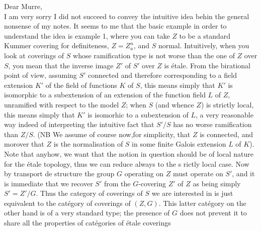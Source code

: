 
Dear Murre,\\

I am very sorry I did not succeed to convey the intuitive idea behin the general nonsense of my notes. It seems to me that the basic example in order to understand the idea is example 1, where you can take $Z$ to be a standard Kummer covering for definiteness, $Z=Z_a^n$, and $S$ normal. Intuitively, when you look at coverings  of $S$ whose ramification type is not worse than the one of $Z$ over $S$, you mean that the  inverse image $Z'$ of $S'$ over $Z$ is étale.  From the birational point of view, assuming $S'$ connected and therefore corresponding to a field extension $K'$ of the field of functions $K$ of $S$, this means simply that $K'$ is isomorphic to a subextension of an extension  of the function field $L$ of $Z$, unramified with respect to the model $Z$; when $S$ (and whence $Z$) is strictly local,  this means simply that $K'$ is isomorhic to a subextension of $L$, a very reasonable way indeed of interpreting the intuitive fact that $S'/S$ has no worse ramification than $Z/S$. (NB We assume of course now,for simplicity, that $Z$ is connected, and morover that $Z$ is the normalisation of $S$ in some finite Galois extension $L$ of $K$). Note that anyhow, we want that the notion in question should be of local nature for the étale topology, thus we can reduce always to the s rictly local case. Now by transport de structure the group $G$ operating on $Z$ must operate on $S'$, and it is immediate that we recover $S'$ from the $G$-covering $Z'$ of $Z$ as being simply $S'=Z'/G$. Thus  the category of coverings of $S$ we are interested in is just equivalent to the catégory of  coverings of $(Z,G)$. This latter catégory on the other hand is of a very standard type; the presence of $G$ does not prevent it to share all the properties of catégories of étale coverings
